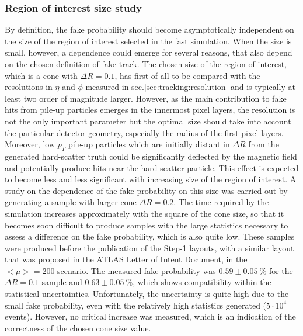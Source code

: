 \documentclass[a4paper,twoside,12pt]{article}
\begin{document}
\subsubsection{Region of interest size study}
By definition, the fake probability should become asymptotically independent on the size of the region of interest selected in the fast simulation. When the size is small, however,
a dependence could emerge for several reasons, that also depend on the chosen definition of fake track. The chosen size of the region of interest, which is a cone with $\Delta R = 0.1$, 
has first of all to be compared with the resolutions in $\eta$ and $\phi$ measured in sec.\ref{sec:tracking:resolution} and is typically at least two order of magnitude larger. However, as the 
main contribution to fake hits from pile-up particles emerges in the innermost pixel layers, the resolution is not the only important parameter but the optimal size should take into account 
the particular detector geometry, especially the radius of the first pixel layers. Moreover, low $p_{T}$ pile-up particles which are initially distant in $\Delta R$ from the
generated hard-scatter truth could be significantly deflected by the magnetic field and potentially produce hits near the hard-scatter particle. This effect is expected to become less and less
significant with increasing size of the region of interest. A study on the dependence of the fake probability on this size was carried out by generating a sample with larger cone $\Delta R = 0.2$.
The time required by the simulation increases approximately with the square of the cone size, so that it becomes soon difficult to produce samples with the large statistics necessary to assess
a difference on the fake probability, which is also quite low. These samples were produced before the publication of the Step-1 layouts, with a similar layout that was proposed in the
ATLAS Letter of Intent Document\cite{loi}, in the $<\mu> = 200$ scenario. The measured fake probability was $0.59 \pm 0.05\ \%$ for the $\Delta R = 0.1$ sample and $0.63 \pm 0.05\ \%$,
which shows compatibility within the statistical uncertainties. Unfortunately, the uncertainty is quite high due to the small fake probability, even with the relatively high statistics generated ($5\cdot 10^{4}$
events). However, no critical increase was measured, which is an indication of the correctness of the chosen cone size value.
\end{document}
